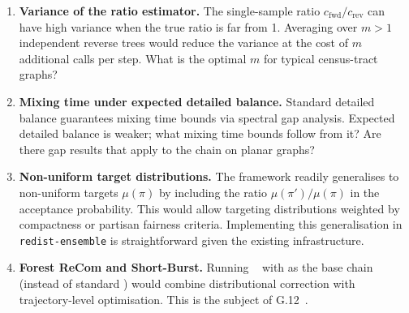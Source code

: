 \begin{enumerate}
  \item \textbf{Variance of the ratio estimator.}
        The single-sample ratio $c_{\mathrm{fwd}} / c_{\mathrm{rev}}$ can have
        high variance when the true ratio is far from 1.
        Averaging over $m > 1$ independent reverse trees would reduce the
        variance at the cost of $m$ additional \ust{} calls per step.
        What is the optimal $m$ for typical census-tract graphs?

  \item \textbf{Mixing time under expected detailed balance.}
        Standard detailed balance guarantees mixing time bounds via spectral
        gap analysis.
        Expected detailed balance is weaker; what mixing time bounds follow
        from it?
        Are there gap results that apply to the \fr{} chain on planar graphs?

  \item \textbf{Non-uniform target distributions.}
        The \fr{} framework readily generalises to non-uniform targets $\mu(\pi)$
        by including the ratio $\mu(\pi') / \mu(\pi)$ in the acceptance probability.
        This would allow targeting distributions weighted by compactness or
        partisan fairness criteria.
        Implementing this generalisation in \texttt{redist-ensemble} is
        straightforward given the existing \fr{} infrastructure.

  \item \textbf{Forest ReCom and Short-Burst.}
        Running \sburst{}~\citep{dellaLibera2026shortburst} with \fr{} as the
        base chain (instead of standard \recom{}) would combine distributional
        correction with trajectory-level optimisation.
        This is the subject of G.12~\citep{dellaLibera2026shortburst}.
\end{enumerate}
